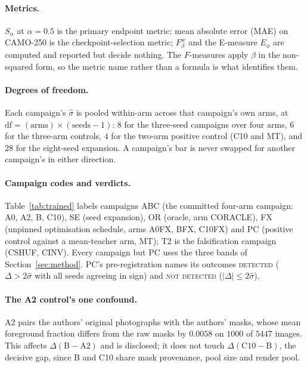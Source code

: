 \documentclass{article}
\begin{document}
\paragraph{Metrics.} $S_\alpha$ at $\alpha = 0.5$ is the primary endpoint metric; mean absolute
error (MAE) on CAMO-250 is the checkpoint-selection metric; $F_\beta^w$ and the E-measure $E_\phi$
are computed and reported but decide nothing.
The $F$-measures apply $\beta$ in the non-squared form, so the metric name rather than a formula is
what identifies them.

\paragraph{Degrees of freedom.} Each campaign's $\hat{\sigma}$ is pooled within-arm across that
campaign's own arms, at $\mathrm{df} = (\text{arms}) \times (\text{seeds} - 1)$: $8$ for the
three-seed campaigns over four arms, $6$ for the three-arm controls, $4$ for the two-arm positive
control (C10 and MT), and $28$ for the eight-seed expansion. A campaign's bar is never swapped for
another campaign's in either direction.

\paragraph{Campaign codes and verdicts.} Table~\ref{tab:trained} labels campaigns ABC (the committed
four-arm campaign: A0, A2, B, C10), SE (seed expansion), OR (oracle, arm CORACLE), FX (unpinned
optimisation schedule, arms A0FX, BFX, C10FX) and PC (positive control against a mean-teacher arm,
MT); T2 is the falsification campaign (CSHUF, CINV). Every campaign but PC uses the three bands of
Section~\ref{sec:method}. PC's pre-registration names its outcomes \textsc{detected} ($\Delta > 2\hat{\sigma}$
with all seeds agreeing in sign) and \textsc{not detected} ($|\Delta| \le 2\hat{\sigma}$).

\paragraph{The A2 control's one confound.} A2 pairs the authors' original photographs with the
authors' masks, whose mean foreground fraction differs from the raw masks by $0.0058$ on $1000$ of
$5447$ images. This affects $\Delta(\mathrm{B}-\mathrm{A2})$ and is disclosed; it does not touch
$\Delta(\mathrm{C10}-\mathrm{B})$, the decisive gap, since B and C10 share mask provenance, pool
size and render pool.
\end{document}
